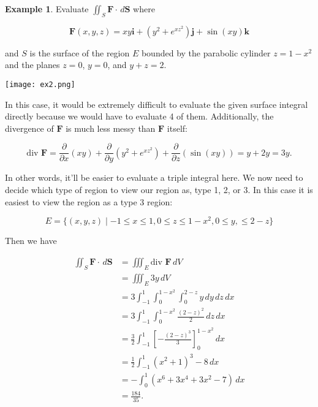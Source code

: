 \documentclass[11pt,oneside,english]{amsart}
\theoremstyle{definition}
\newtheorem*{example}{Example}
\newcommand{\pp}[2]{\frac{\partial{#1}}{\partial{#2}}}
\begin{document}
\vfill
\pagebreak

\begin{example}
Evaluate $\iint_S\mathbf{F}\cdot\,d\mathbf{S}$ where

\[
\mathbf{F}(x,y,z)=xy\mathbf{i}+(y^2+e^{xz^2})\mathbf{j}+\sin(xy)\mathbf{k}
\]

and $S$ is the surface of the region $E$ bounded by the parabolic cylinder $z=1-x^2$ and the planes $z=0$, $y=0$, and $y+z=2$.

\begin{center}
\texttt{[image: ex2.png]}
\end{center}

In this case, it would be extremely difficult to evaluate the given surface integral directly because we would have to evaluate 4 of them. Additionally, the divergence of $\mathbf{F}$ is much less messy than $\mathbf{F}$ itself:

\[
\text{div }\mathbf{F}=\pp{}{x}(xy)+\pp{}{y}(y^2+e^{xz^2})+\pp{}{z}(\sin(xy))=y+2y=3y.
\]

In other words, it'll be easier to evaluate a triple integral here. We now need to decide which type of region to view our region as, type 1, 2, or 3. In this case it is easiest to view the region as a type 3 region:

\[
E=\{(x,y,z)\mid-1\leq x\leq 1,0\leq z\leq 1-x^2,0\leq y,\leq 2-z\}
\]

Then we have

\begin{align*}
\iint_S\mathbf{F}\cdot\,d\mathbf{S}&=\iiint_E\text{div }\mathbf{F}\,dV\\[2mm]
&=\iiint_E3y\,dV\\[2mm]
&=3\int_{-1}^1\int_0^{1-x^2}\int_0^{2-z}y\,dy\,dz\,dx\\[2mm]
&=3\int_{-1}^1\int_0^{1-x^2}\frac{(2-z)^2}{2}\,dz\,dx\\[2mm]
&=\frac{3}{2}\int_{-1}^1\left[-\frac{(2-z)^3}{3}\right]_0^{1-x^2}\,dx\\[2mm]
&=\frac{1}{2}\int_{-1}^1(x^2+1)^3-8\,dx\\[2mm]
&=-\int_0^1(x^6+3x^4+3x^2-7)\,dx\\[2mm]
&=\frac{184}{35}.
\end{align*}
\end{example}
\end{document}
